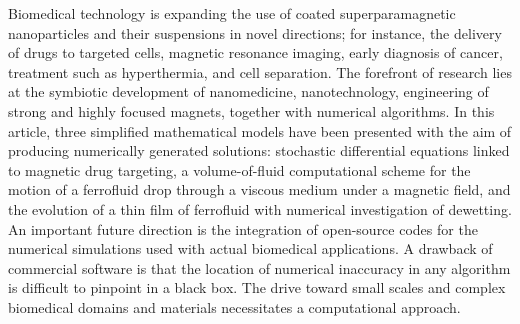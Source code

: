 Biomedical technology is expanding the use of coated superparamagnetic nanoparticles and their suspensions in novel directions; for instance, the delivery of drugs to targeted cells, magnetic resonance imaging, early diagnosis of cancer, treatment such as hyperthermia,  and cell separation.  The forefront of research lies at the symbiotic development of nanomedicine, nanotechnology, engineering of strong and highly focused magnets, together with numerical algorithms. In this article, three simplified mathematical models have been presented with the aim of producing numerically generated solutions: stochastic differential equations linked to magnetic drug targeting, a volume-of-fluid computational scheme for the motion of a ferrofluid drop through a viscous medium under a magnetic field, and the evolution of a thin film of ferrofluid with numerical investigation of dewetting. An important future direction is the integration of open-source codes for the numerical simulations used with actual biomedical applications. A drawback of commercial software is that the  location of numerical  inaccuracy in any algorithm is difficult to pinpoint in a black box. The drive toward small scales and complex biomedical domains and materials necessitates a computational approach. 